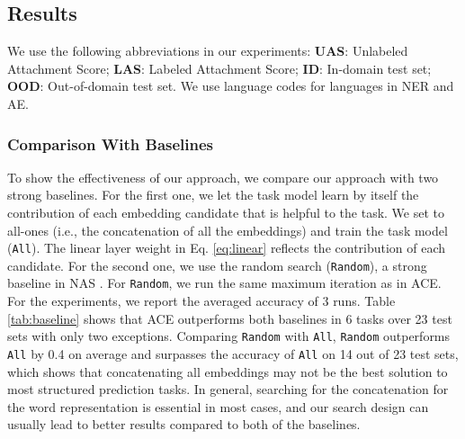 \documentclass[11pt,a4paper]{article}
\begin{document}
\subsection{Results}
We use the following abbreviations in our experiments: \textbf{UAS}: Unlabeled Attachment Score; \textbf{LAS}: Labeled Attachment Score; \textbf{ID}: In-domain test set; \textbf{OOD}: Out-of-domain test set. We use language codes for languages in NER and AE.

\subsubsection{Comparison With Baselines} \label{sec:exp:base}
To show the effectiveness of our approach, we compare our approach with two strong baselines. For the first one, we let the task model learn by itself the contribution of each embedding candidate that is helpful to the task. We set  to all-ones (i.e., the concatenation of all the embeddings) and train the task model ({\tt All}). The linear layer weight  in Eq. \ref{eq:linear} reflects the contribution of each candidate. For the second one, we use the random search ({\tt Random}), a strong baseline in NAS \citep{li2020random}. For {\tt Random}, we run the same maximum iteration as in ACE. For the experiments, we report the averaged accuracy of 3 runs. Table \ref{tab:baseline} shows that ACE outperforms both baselines in 6 tasks over 23 test sets with only two exceptions. Comparing {\tt Random} with {\tt All}, {\tt Random} outperforms {\tt All} by 0.4 on average and surpasses the accuracy of {\tt All} on 14 out of 23 test sets, which shows that concatenating all embeddings may not be the best solution to most structured prediction tasks. 
In general, searching for the concatenation for the word representation is essential in most cases, and our search design can usually lead to better results compared to both of the baselines.
\end{document}
